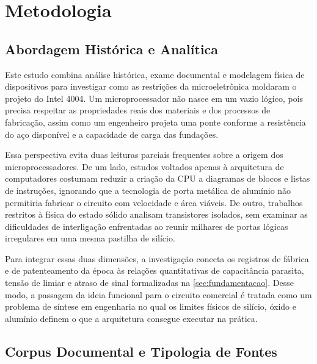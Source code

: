 
\section{Metodologia}
\label{sec:metodologia}

\subsection{Abordagem Histórica e Analítica}
\label{subsec:metodologia_abordagem}

Este estudo combina análise histórica, exame documental e modelagem física de dispositivos para investigar como as restrições da microeletrônica moldaram o projeto do Intel 4004. Um microprocessador não nasce em um vazio lógico, pois precisa respeitar as propriedades reais dos materiais e dos processos de fabricação, assim como um engenheiro projeta uma ponte conforme a resistência do aço disponível e a capacidade de carga das fundações.

Essa perspectiva evita duas leituras parciais frequentes sobre a origem dos microprocessadores. De um lado, estudos voltados apenas à arquitetura de computadores costumam reduzir a criação da CPU a diagramas de blocos e listas de instruções, ignorando que a tecnologia de porta metálica de alumínio não permitiria fabricar o circuito com velocidade e área viáveis. De outro, trabalhos restritos à física do estado sólido analisam transistores isolados, sem examinar as dificuldades de interligação enfrentadas ao reunir milhares de portas lógicas irregulares em uma mesma pastilha de silício.

Para integrar essas duas dimensões, a investigação conecta os registros de fábrica e de patenteamento da época às relações quantitativas de capacitância parasita, tensão de limiar e atraso de sinal formalizadas na \cref{sec:fundamentacao}. Desse modo, a passagem da ideia funcional para o circuito comercial é tratada como um problema de síntese em engenharia no qual os limites físicos de silício, óxido e alumínio definem o que a arquitetura consegue executar na prática.

\subsection{Corpus Documental e Tipologia de Fontes}
\label{subsec:metodologia_corpus}


